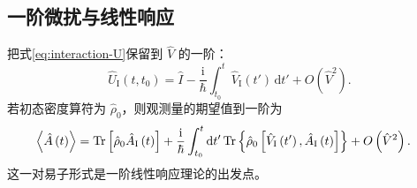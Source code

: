 \subsection{一阶微扰与线性响应}
把式\eqref{eq:interaction-U}保留到 $\hat V$ 的一阶：
\begin{equation}
\hat U_{\mathrm{I}}\left(t,t_0\right)
=\hat I-\frac{\mathrm{i}}{\hbar}\int_{t_0}^{t}
\hat V_{\mathrm{I}}\left(t'\right)\,\mathrm{d}t'+O\left(\hat V^2\right).
\end{equation}
若初态密度算符为 $\hat\rho_0$，则观测量的期望值到一阶为
\begin{align}
\Braket{\hat A\left(t\right)}
&=\operatorname{Tr}\left[\hat\rho_0\hat A_{\mathrm{I}}\left(t\right)\right]
+\frac{\mathrm{i}}{\hbar}\int_{t_0}^{t}\mathrm{d}t'
\operatorname{Tr}\left\{\hat\rho_0
\left[\hat V_{\mathrm{I}}\left(t'\right),\hat A_{\mathrm{I}}\left(t\right)\right]\right\}
+O\left(\hat V^2\right).
\end{align}
这一对易子形式是一阶线性响应理论的出发点。
